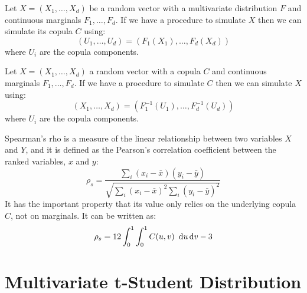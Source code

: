 \documentclass[11pt,fleqn]{book} %
\begin{document}
\begin{corollary}
	\label{cor:cop2}
	Let $X=(X_1, \dots, X_d)$ be a random vector with a multivariate 
	distribution $F$ and continuous marginals $F_1, \dots, F_d$.
	If we have a procedure to simulate $X$ then we can simulate 
	its copula $C$ using:
	\begin{displaymath}
		(U_1, \dots, U_d) = (F_1(X_1), \dots, F_d(X_d))
	\end{displaymath}
	where $U_i$ are the copula components.
\end{corollary}

\begin{corollary}
	\label{cor:cop3}
	Let $X=(X_1, \dots, X_d)$ a random vector with a copula $C$
	and continuous marginals $F_1, \dots, F_d$. If we have a
	procedure to simulate $C$ then we can simulate $X$ using:
	\begin{displaymath}
		(X_1, \dots, X_d) = (F_1^{-1}(U_1), \dots, F_d^{-1}(U_d))
	\end{displaymath}
	where $U_i$ are the copula components.
\end{corollary}

\begin{definition}
	Spearman's rho is a measure of the linear relationship between two 
	variables $X$ and $Y$, and it is defined as the Pearson's correlation 
	coefficient between the ranked variables, $x$ and $y$:
	\begin{displaymath}
		\rho_s = \frac{\displaystyle \sum_i (x_i-\bar{x}) (y_i-\bar{y})}
		{\sqrt{\displaystyle \sum_i (x_i-\bar{x})^2 \sum_i (y_i-\bar{y})^2}}
	\end{displaymath}
	It has the important property that its value only relies on the underlying 
	copula $C$, not on marginals. It can be written as:
	\begin{displaymath}
		\rho_s = 12 \displaystyle \int_0^1 \int_0^1 C(u,v)\ \mathop{\mathrm{{}d}}\mathopen{} u \mathop{\mathrm{{}d}}\mathopen{} v -3
	\end{displaymath}
\end{definition}

\section{Multivariate t-Student Distribution}
\label{ap:mtsd}
\end{document}
